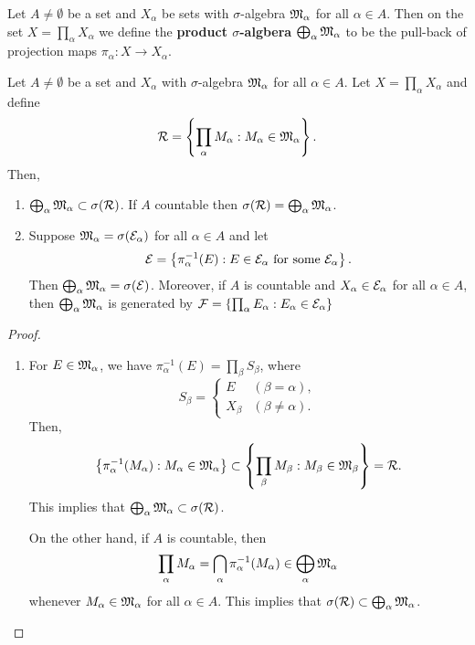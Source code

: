 \documentclass[a4paper]{article}
\begin{document}
\begin{defi}
  Let $A \neq \emptyset$ be a set and $X_\alpha$ be sets 
  with $\sigma$-algebra $\mathfrak{M}_\alpha$ for all 
    $\alpha \in A$. Then on the set $X = \prod_\alpha X_\alpha$
    we define the \textbf{product $\sigma$-algbera} 
    $\bigoplus_\alpha \mathfrak{M}_\alpha$ to be the 
    pull-back of projection maps 
    $\pi_\alpha : X \to X_\alpha$.
\end{defi}
{
\begin{thm}
  Let $A \neq \emptyset$ be a set and $X_\alpha$ 
  with $\sigma$-algebra $\mathfrak{M}_\alpha$ for all $\alpha 
  \in A$. Let $X = \prod_\alpha X_\alpha$ and 
  define 
  \[
  \mathcal{R} = \left\{ \prod_\alpha M_\alpha: 
  M_\alpha \in \mathfrak{M}_\alpha \right\}.
  \]
  Then, 
  \begin{enumerate}
    \item $\bigoplus_\alpha \mathfrak{M}_\alpha \subset \sigma 
    (\mathcal{R})$. If $A$ countable then $\sigma(\mathcal{R}) 
    = \bigoplus_\alpha \mathfrak{M}_\alpha$.
    
    \item Suppose $\mathfrak{M}_\alpha = \sigma(\mathcal{E}_\alpha)$
    for all $\alpha \in A$ and let 
    \[
    \mathcal{E} = \left\{ \pi_\alpha^{-1}(E) : 
    E \in \mathcal{E}_\alpha \text{ for some $\mathcal{E}_\alpha$} \right\}.
    \]
    Then $\bigoplus_\alpha \mathfrak{M}_\alpha = \sigma(\mathcal{E})$. 
    Moreover, if $A$ is countable and $X_\alpha \in \mathcal{E}_\alpha$
    for all $\alpha \in A$, then $\bigoplus_\alpha \mathfrak{M}_\alpha$
    is generated by $\mathcal{F} = \left\{ \prod_\alpha E_\alpha :
    E_\alpha \in \mathcal{E}_\alpha \right\}$
  \end{enumerate}
\end{thm}

\begin{proof}
\begin{enumerate}
\item For $E \in \mathfrak{M}_\alpha$, we have 
$\pi^{-1}_\alpha (E) = \prod_\beta S_\beta$, where 
\[
S_\beta = \begin{cases}
  E & (\beta = \alpha), \\ 
  X_\beta & (\beta \neq \alpha).
\end{cases}
\]
Then, 
\[
\left\{ \pi_\alpha^{-1}(M_\alpha) : M_\alpha 
\in \mathfrak{M}_\alpha \right\}
\subset \left\{ \prod_\beta M_\beta: M_\beta \in 
\mathfrak{M}_\beta \right\} = \mathcal{R}.
\]
This implies that $\bigoplus_\alpha \mathfrak{M}_\alpha \subset 
\sigma(\mathcal{R})$.

On the other hand, if $A$ is countable, then 
\[
\prod_\alpha M_\alpha = 
\bigcap_\alpha \pi_\alpha^{-1} (M_\alpha) 
\in \bigoplus_\alpha \mathfrak{M}_\alpha
\]
whenever $M_\alpha \in \mathfrak{M}_\alpha$ for all $\alpha \in A$.
This implies that $\sigma(\mathcal{R}) \subset \bigoplus_\alpha 
\mathfrak{M}_\alpha$.


\end{enumerate}
\end{proof}}
\end{document}
